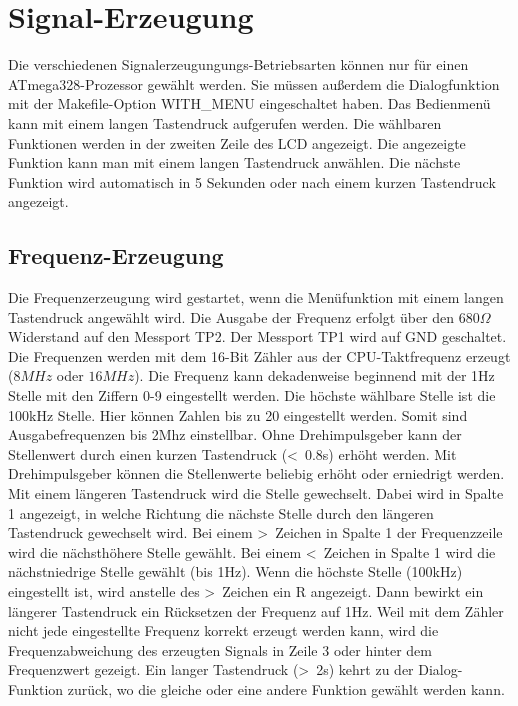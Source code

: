 \chapter{Signal-Erzeugung}

Die verschiedenen Signalerzeugungungs-Betriebsarten können nur für einen ATmega328-Prozessor
gewählt werden.
Sie müssen außerdem die Dialogfunktion mit der Makefile-Option WITH\_MENU eingeschaltet haben.
Das Bedienmenü kann mit einem langen Tastendruck aufgerufen werden.
Die wählbaren Funktionen werden in der zweiten Zeile des LCD angezeigt.
Die angezeigte Funktion kann man mit einem langen Tastendruck anwählen.
Die nächste Funktion wird automatisch in 5 Sekunden oder nach einem kurzen Tastendruck
angezeigt.

\label{sec:generation}

\section{Frequenz-Erzeugung}
Die Frequenzerzeugung wird gestartet, wenn die Menüfunktion  mit einem
langen Tastendruck angewählt wird.
Die Ausgabe der Frequenz erfolgt über den \(680\Omega\) Widerstand auf den Messport TP2.
Der Messport TP1 wird auf GND geschaltet.
Die Frequenzen werden mit dem 16-Bit Zähler aus der CPU-Taktfrequenz erzeugt (\(8MHz\) oder \(16MHz\)).
Die Frequenz kann dekadenweise beginnend mit der 1Hz Stelle mit den Ziffern 0-9 eingestellt werden.
Die höchste wählbare Stelle ist die 100kHz Stelle. Hier können Zahlen bis zu 20 eingestellt werden.
Somit sind Ausgabefrequenzen bis 2Mhz einstellbar.
Ohne Drehimpulsgeber kann der Stellenwert durch einen kurzen Tastendruck (\textless~0.8s)
erhöht werden.
Mit Drehimpulsgeber können die Stellenwerte beliebig erhöht oder erniedrigt werden.
Mit einem längeren Tastendruck wird die Stelle gewechselt.
Dabei wird in Spalte 1 angezeigt, in welche Richtung die nächste Stelle durch den längeren
Tastendruck gewechselt wird.
Bei einem \textgreater~Zeichen in Spalte 1 der Frequenzzeile wird die nächsthöhere
Stelle gewählt.
Bei einem \textless~Zeichen in Spalte 1  wird die nächstniedrige Stelle gewählt (bis 1Hz).
Wenn die höchste Stelle (100kHz) eingestellt ist, wird anstelle des \textgreater~Zeichen
ein R angezeigt. Dann bewirkt ein längerer Tastendruck ein Rücksetzen der Frequenz auf 1Hz.
Weil mit dem Zähler nicht jede eingestellte Frequenz korrekt erzeugt werden kann,
wird die Frequenzabweichung des erzeugten Signals in Zeile 3 oder hinter dem Frequenzwert gezeigt.
Ein langer Tastendruck (\textgreater~2s) kehrt zu der Dialog-Funktion zurück,
wo die gleiche oder eine andere Funktion gewählt werden kann.

